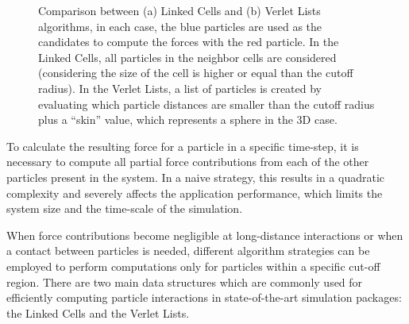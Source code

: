 \documentclass[Afour,sageh,times]{sagej}
\begin{document}
\begin{figure}[htb]
    \centering
    \caption{Comparison between (a) Linked Cells and (b) Verlet Lists algorithms, in each case, the blue particles are used as the candidates to compute the forces with the red particle. In the Linked Cells, all particles in the neighbor cells are considered (considering the size of the cell is higher or equal than the cutoff radius). In the Verlet Lists, a list of particles is created by evaluating which particle distances are smaller than the cutoff radius plus a ``skin'' value, which represents a sphere in the 3D case.}
\end{figure}

To calculate the resulting force for a particle in a specific time-step, it is necessary to compute all partial force contributions from each of the other particles present in the system.
In a naive strategy, this results in a quadratic complexity and severely affects the application performance, which limits the system size and the time-scale of the simulation.

When force contributions become negligible at long-distance interactions or when a contact between particles is needed, different algorithm strategies can be employed to perform computations only for particles within a specific cut-off region.
There are two main data structures which are commonly used for efficiently computing particle interactions in state-of-the-art simulation packages: the Linked Cells and the Verlet Lists.
\end{document}
